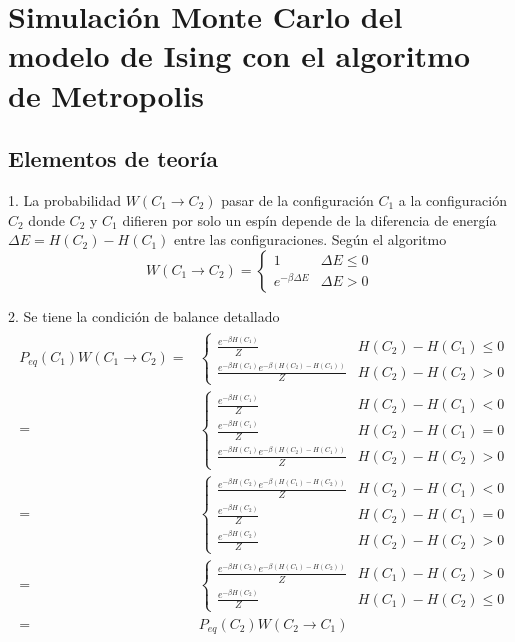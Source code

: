 \documentclass{article}
\begin{document}
\section{Simulación Monte Carlo del modelo de Ising con el algoritmo de Metropolis}

\subsection{Elementos de teoría}

1. La probabilidad $W(C_1\rightarrow C_2)$ pasar de la configuración $C_1$ a la configuración $C_2$ donde $C_2$ y $C_1$ difieren por solo un espín depende de la diferencia de energía $\Delta E=H(C_2)-H(C_1)$ entre las configuraciones. Según el algoritmo
\begin{equation}
W(C_1\rightarrow C_2)=\begin{cases}
1 & \Delta E\leq 0 \\
e^{-\beta\Delta E} & \Delta E> 0
\end{cases}
\end{equation}

2. Se tiene la condición de balance detallado
\begin{align}\label{ec:condicion_de_balance_detallado}
\begin{split}
P_{eq}(C_1)W(C_1\rightarrow C_2)=&\begin{cases}
\frac{e^{-\beta H(C_1)}}{Z} & H(C_2)-H(C_1)\leq 0\\
\frac{e^{-\beta H(C_1)}e^{-\beta (H(C_2)-H(C_1))}}{Z} & H(C_2) - H(C_2) > 0
\end{cases}\\
=&\begin{cases}
\frac{e^{-\beta H(C_1)}}{Z} & H(C_2)-H(C_1)< 0\\
\frac{e^{-\beta H(C_1)}}{Z} & H(C_2)-H(C_1)= 0\\
\frac{e^{-\beta H(C_1)}e^{-\beta (H(C_2)-H(C_1))}}{Z} & H(C_2) - H(C_2) > 0
\end{cases}\\
=&\begin{cases}
\frac{e^{-\beta H(C_2)}e^{-\beta (H(C_1)-H(C_2))}}{Z} & H(C_2)-H(C_1)< 0\\
\frac{e^{-\beta H(C_2)}}{Z} & H(C_2)-H(C_1)= 0\\
\frac{e^{-\beta H(C_2)}}{Z} & H(C_2) - H(C_2) > 0
\end{cases}\\
=&\begin{cases}
\frac{e^{-\beta H(C_2)}e^{-\beta (H(C_1)-H(C_2))}}{Z} & H(C_1)-H(C_2)> 0\\
\frac{e^{-\beta H(C_2)}}{Z} & H(C_1) - H(C_2) \leq 0
\end{cases}\\
=&P_{eq}(C_2)W(C_2\rightarrow C_1)
\end{split}
\end{align}
\end{document}
